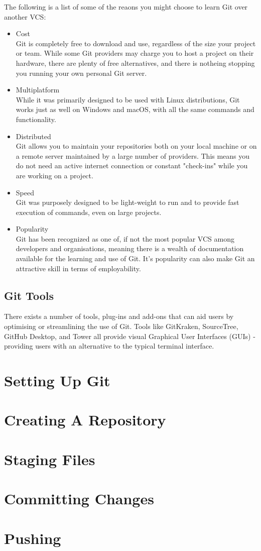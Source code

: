 \documentclass[11pt, a4paper, draft, titlepage]{article}
\begin{document}
The following is a list of some of the reaons you might choose to learn Git
over another VCS:
\begin{itemize} 
\item Cost \\
Git is completely free to download and use, regardless of the size your
project or team.  
While some Git providers may charge you to host a project on
their hardware, there are plenty of free alternatives, and there is notheing
stopping you running your own personal Git server.  
\item Multiplatform \\ 
While it was primarily designed to be used with Linux distributions, Git works
just as well on Windows and macOS, with all the same commands and functionality.
\item Distributed \\ 
Git allows you to maintain your repositories both on your local machine or on
a remote server maintained by a large number of providers. 
This means you do not need an active internet connection or constant
"check-ins" while you are working on a project.
\item Speed \\
Git was purposely designed to be light-weight to run and to provide fast
execution of commands, even on large projects.
\item Popularity \\ 
Git has been recognized as one of, if not the most popular VCS among
developers and organisations, meaning there is a wealth of documentation
available for the learning and use of Git. 
It's popularity can also make Git an attractive skill in terms of
employability.
\end{itemize}


\subsection{Git Tools} There exists a number of tools, plug-ins and add-ons
that can aid users by optimising or streamlining the use of Git.  
Tools like GitKraken,  SourceTree, GitHub Desktop, and Tower all
provide visual Graphical User Interfaces (GUIs) - providing users with an
alternative to the typical terminal interface.

\section{Setting Up Git}

\section{Creating A Repository}

\section{Staging Files}

\section{Committing Changes}

\section{Pushing}
\end{document}
